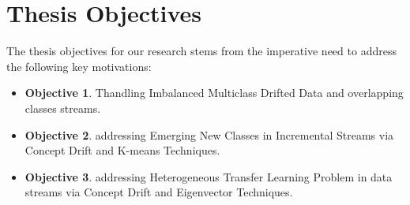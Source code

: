 \section{Thesis Objectives}
\label{sec:1_introduction_motivation}
The thesis objectives for our research stems from the imperative need to address the following key motivations:
\begin{itemize}
    \item \textbf{Objective 1}. Thandling Imbalanced Multiclass Drifted Data and overlapping classes streams.
    \item \textbf{Objective 2}. addressing Emerging New Classes in Incremental Streams via Concept Drift and K-means Techniques.
    \item \textbf{Objective 3}. addressing Heterogeneous Transfer Learning Problem in data streams via Concept Drift and Eigenvector Techniques.
\end{itemize}
